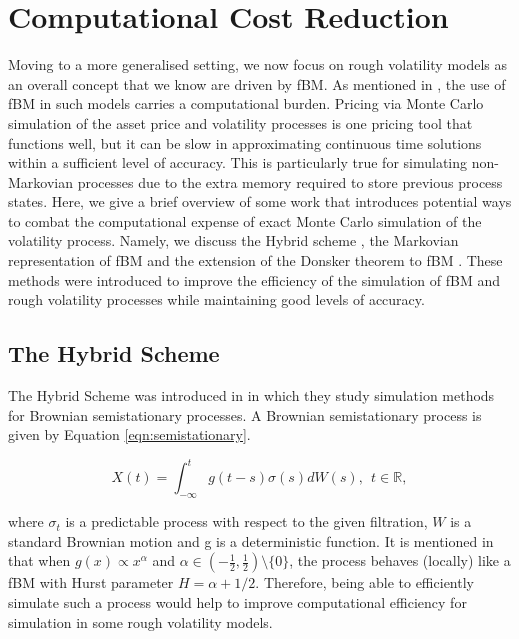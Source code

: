 \documentclass[12pt,oneside]{article}
\begin{document}
\section{Computational Cost Reduction}
\label{sec:comp_advancement}
Moving to a more generalised setting, we now focus on rough volatility models as an overall concept that we know are driven by fBM. As mentioned in \cite{Jacquier2020}, the use of fBM in such models carries a computational burden. Pricing via Monte Carlo simulation of the asset price and volatility processes is one pricing tool that functions well, but it can be slow in approximating continuous time solutions within a sufficient level of accuracy. This is particularly true for simulating non-Markovian processes due to the extra memory required to store previous process states. Here, we give a brief overview of some work that introduces potential ways to combat the computational expense of exact Monte Carlo simulation of the volatility process. Namely, we discuss the Hybrid scheme \cite{Bennedsen2017}, the Markovian representation of fBM \cite{Harms2020} and the extension of the Donsker theorem to fBM \cite{Horvath2019}. These methods were introduced to improve the efficiency of the simulation of fBM and rough volatility processes while maintaining good levels of accuracy.

\subsection{The Hybrid Scheme}
\label{subsec:hybrid_scheme}
The Hybrid Scheme was introduced in \cite{Bennedsen2017} in which they study simulation methods for Brownian semistationary processes. A Brownian semistationary process is given by Equation \ref{eqn:semistationary}. 

\begin{equation}
\label{eqn:semistationary}
X(t)=\int_{-\infty}^t g(t-s) \sigma(s) dW(s),  \ \  t\in\mathbb{R},
\end{equation}

where $\sigma_t$ is a predictable process with respect to the given filtration, $W$ is a standard Brownian motion and g is a deterministic function. It is mentioned in \cite{Bennedsen2017} that when $g(x) \propto x^\alpha$ and $\alpha \in (-\frac{1}{2}, \frac{1}{2}) \setminus \{0\}$, the process behaves (locally) like a fBM with Hurst parameter $H=\alpha+1/2$.  Therefore, being able to efficiently simulate such a process would help to improve computational efficiency for simulation in some rough volatility models.  
\\
\end{document}
